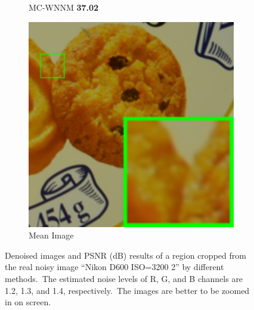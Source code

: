\begin{figure}
\begin{subfigure}[t]{0.19\textwidth}
		\caption{MC-WNNM \textbf{37.02}}
    \end{subfigure}
    \hfill
    \begin{subfigure}[t]{0.19\textwidth}
        \centering
        \includegraphics[width=1\textwidth]{images/mcwnnm/cc/resize_br_d600_iso3200_2.png}
		\caption{Mean Image}
    \end{subfigure}
    \caption{Denoised images and PSNR (dB) results of a region cropped from the real noisy image ``Nikon D600 ISO=3200 2'' \cite{crosschannel2016} by different methods.\ The estimated noise levels of R, G, and B channels are 1.2, 1.3, and 1.4, respectively.\ The images are better to be zoomed in on screen.}
    \label{fig4-15}
\end{figure}



